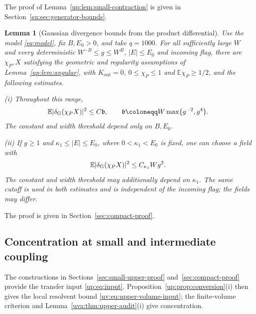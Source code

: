 \documentclass[11pt]{article}
\numberwithin{equation}{section}
\newtheorem{lemma}[theorem]{Lemma}
\theoremstyle{remark}
\newcommand{\E}{\mathbb E}
\begin{document}
The proof of Lemma~\ref{up:lem:small-contraction} is given in
Section~\ref{su:sec:generator-bounds}.

\begin{lemma}[Gaussian divergence bounds from the product differential]
\label{up:lem:density-contraction}
Use the model \eqref{eq:model}, fix $B,E_0>0$, and take $q=1000$.
For all sufficiently large $W$ and every deterministic
$W^{-B}\le g\le W^B$, $|E|\le E_0$ and incoming flag, there are
$\chi_P,X$ satisfying the geometric and regularity assumptions of
Lemma~\ref{up:lem:angular}, with $K_{\mathrm{out}}=0$, $0\le\chi_P\le1$ and
$\E\chi_P\ge1/2$, and the following estimates.

\noindent\textup{(i)} Throughout this range,
\begin{equation}\label{eq:c-common-scale}
 \E|\delta_{\rm G}(\chi_P X)|^2\le C\mathfrak b,
 \qquad \mathfrak b\coloneqq W\max\{g^{-2},g^4\}.
\end{equation}
The constant and width threshold depend only on $B,E_0$.

\noindent\textup{(ii)} If $g\ge1$ and
$\kappa_1\le|E|\le E_0$, where $0<\kappa_1<E_0$ is fixed, one can
choose a field with
\[
 \E|\delta_{\rm G}(\chi_P X)|^2\le C_{\kappa_1}Wg^2.
\]
The constant and width threshold may additionally depend on $\kappa_1$.
The same cutoff is used in both estimates and is independent of the
incoming flag; the fields may differ.
\end{lemma}

The proof is given in Section~\ref{sec:compact-proof}.

\subsection{Concentration at small and intermediate coupling}
\label{sec:upper-center-completion}

The constructions in Sections~\ref{sec:small-upper-proof}
and~\ref{sec:compact-proof} provide the transfer input
\eqref{up:eq:input}. Proposition~\ref{up:prop:conversion}\textup{(i)}
then gives the local resolvent bound
\eqref{uv:eq:upper-volume-input}; the finite-volume criterion and
Lemma~\ref{uva:thm:upper-audit}\textup{(i)} give concentration.
\end{document}
